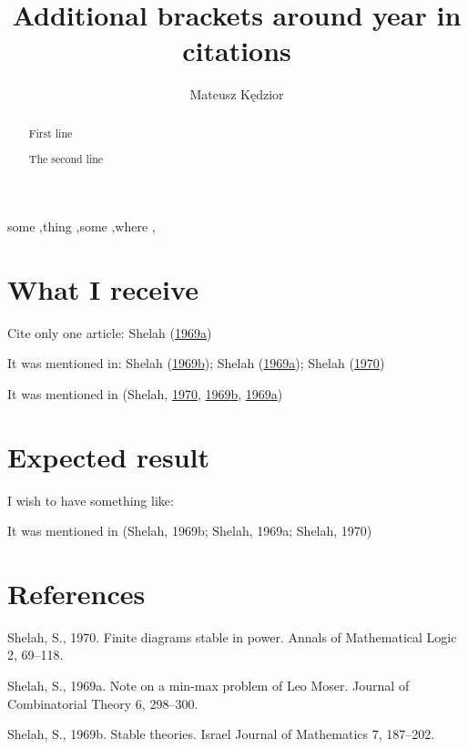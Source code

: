 \documentclass[]{elsarticle} %
\begin{document}
\begin{frontmatter}

  \title{Additional brackets around year in citations}
    \author[WUT]{Mateusz Kędzior}
    
  \begin{abstract}
  First line
  
  The second line
  \end{abstract}
   \begin{keyword} some \sep thing \sep some \sep where \sep \end{keyword}
 \end{frontmatter}

\section{What I receive}\label{what-i-receive}

Cite only one article: Shelah
(\protect\hyperlink{ref-Sh:2}{1969}\protect\hyperlink{ref-Sh:2}{a})

It was mentioned in: Shelah
(\protect\hyperlink{ref-Sh:1}{1969}\protect\hyperlink{ref-Sh:1}{b});
Shelah
(\protect\hyperlink{ref-Sh:2}{1969}\protect\hyperlink{ref-Sh:2}{a});
Shelah (\protect\hyperlink{ref-Sh:3}{1970})

It was mentioned in (Shelah, \protect\hyperlink{ref-Sh:3}{1970},
\protect\hyperlink{ref-Sh:1}{1969}\protect\hyperlink{ref-Sh:1}{b},
\protect\hyperlink{ref-Sh:2}{1969}\protect\hyperlink{ref-Sh:2}{a})

\section{Expected result}\label{expected-result}

I wish to have something like:

It was mentioned in (Shelah, 1969b; Shelah, 1969a; Shelah, 1970)

\section*{References}\label{references}

\hypertarget{refs}{}
\hypertarget{ref-Sh:3}{}
Shelah, S., 1970. Finite diagrams stable in power. Annals of
Mathematical Logic 2, 69--118.

\hypertarget{ref-Sh:2}{}
Shelah, S., 1969a. Note on a min-max problem of Leo Moser. Journal of
Combinatorial Theory 6, 298--300.

\hypertarget{ref-Sh:1}{}
Shelah, S., 1969b. Stable theories. Israel Journal of Mathematics 7,
187--202.
\end{document}

